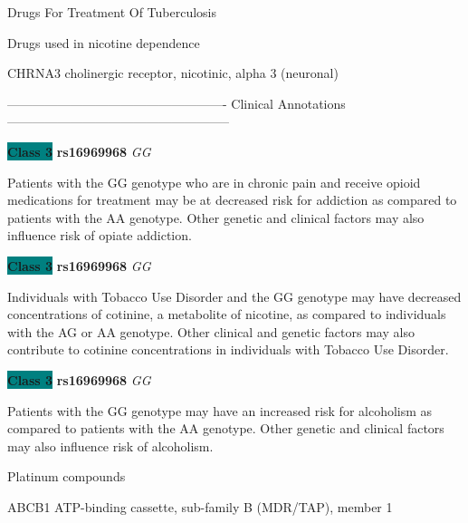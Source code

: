 \documentclass{resume} %
\begin{document}
\begin{rSection}{ Drugs For Treatment Of Tuberculosis }
\end{rSection}\begin{rSection}{ Drugs used in nicotine dependence }
\item[]

\begin{rSubsection}{ CHRNA3 }{ cholinergic receptor, nicotinic, alpha 3 (neuronal) }{}{}
\item[]

\item[] ---------------------------------------------------- Clinical Annotations -----------------------------------------------------\newline
\item \textbf{\colorbox{teal} {Class 3}} \textbf{ rs16969968 } \textit{ GG }
\item[] Patients with the GG genotype who are in chronic pain and receive opioid medications for treatment may be at decreased risk for addiction as compared to patients with the AA genotype. Other genetic and clinical factors may also influence risk of opiate addiction.\item \textbf{\colorbox{teal} {Class 3}} \textbf{ rs16969968 } \textit{ GG }
\item[] Individuals with Tobacco Use Disorder and the GG genotype may have decreased concentrations of cotinine, a metabolite of nicotine, as compared to individuals with the AG or AA genotype. Other clinical and genetic factors may also contribute to cotinine concentrations in individuals with Tobacco Use Disorder.\item \textbf{\colorbox{teal} {Class 3}} \textbf{ rs16969968 } \textit{ GG }
\item[] Patients with the GG genotype may have an increased risk for alcoholism as compared to patients with the AA genotype. Other genetic and clinical factors may also influence risk of alcoholism.
\end{rSubsection}

\end{rSection}\begin{rSection}{ Platinum compounds }
\item[]

\begin{rSubsection}{ ABCB1 }{ ATP-binding cassette, sub-family B (MDR/TAP), member 1 }{}{}
\item[]


\end{rSubsection}
\end{rSection}
\end{document}
